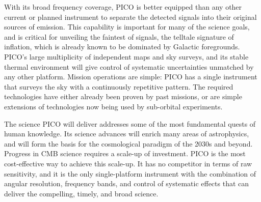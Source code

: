 \documentclass[PICOAPC.tex]{subfiles}
\begin{document}



With its broad frequency coverage, PICO is better equipped than any other current or planned instrument to separate the detected signals into their original sources of emission.  This capability is important for many of the science goals, and is critical for unveiling the faintest of signals, the telltale signature of inflation, which is already known to be dominated by Galactic foregrounds. 
PICO's large multiplicity of independent maps and sky surveys, and its stable thermal environment will give control of systematic uncertainties unmatched by any other platform. 
Mission operations are simple: PICO has a single instrument that surveys the sky with a continuously repetitive pattern.  
The required technologies have either already been proven by past missions, or are simple extensions of technologies now being used by sub-orbital experiments. 
 

The science PICO will deliver addresses some of the most fundamental quests of human knowledge. Its science advances will enrich many areas of astrophysics, and will form the basis for the cosmological paradigm of the 2030s and beyond. %
Progress in CMB science requires a scale-up of investment. PICO is the most cost-effective way to achieve this scale-up. It has no competitor in terms of raw sensitivity, and it is the only single-platform instrument with the combination of angular resolution, frequency bands, and control of systematic effects that can deliver the compelling, timely, and broad science. 
\end{document}
